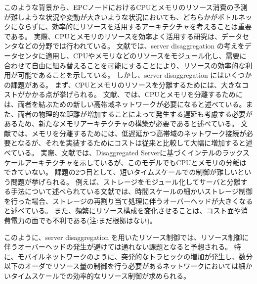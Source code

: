 \documentclass[a4j]{ujarticle}
\begin{document}
このような背景から、EPCノードにおけるCPUとメモリのリソース消費の予測が難しような状況や変動が大きいような状況においても、どちらかがボトルネックにならずに、効率的にリソースを活用するアーキテクチャを考えることは重要である。
実際、CPUとメモリのリソースを効率よく活用する研究は、データセンタなどの分野では行われている。
文献\cite{TechnoEconomicFrameworkforCloudInfrastructureACostStudyofResourceDisaggregation}では、server disaggregation の考えをデータセンタに適用し、CPUやメモリなどのリソースをモジュール化し、需要に合わせて自由に組み替えることを可能にすることにより、リソースの効率的な利用が可能であることを示している。
しかし、server disaggregation にはいくつかの課題がある。
まず、CPUとメモリのリソースを分離するためには、大きなコストがかかる点が挙げられる。
文献\cite{IntelsDisaggregatedServerRack}、\cite{EnhancedBackoffTimerSolutionforGTPCOverloadControl}では、CPUとメモリを分離するためには、両者を結ぶための新しい高帯域ネットワークが必要になると述べている。また、両者の物理的な距離が増加することによって発生する遅延も考慮する必要があるため、新たなメモリアーキテクチャの構築が必要であると述べている。
文献\cite{DisaggregatedandOpticallyInterconnectedMemoryWhenwillitbecosteffective}では、メモリを分離するためには、低遅延かつ高帯域のネットワーク接続が必要となるが、それを実装するためにコストは従来と比較して大幅に増加すると述べている。
実際、文献\cite{DisaggregatedServersDriveDataCenterEfficiencyandInnovation}では、Disaggregated Serverに基づくインテルのラックスケールアーキテクチャを示しているが、このモデルでもCPUとメモリの分離はできていない。
課題の2つ目として、短いタイムスケールでの制御が難しいという問題が挙げられる。
例えば、ストレージをモジュール化してサーバと分離する手法について述べられている文献\cite{UnderstandingRackScaleDisaggregatedStorage}では、時間スケールの細かいストレージ制御を行った場合、ストレージの再割り当て処理に伴うオーバーヘッドが大きくなると述べている。
また、頻繁にリソース構成を変化させることは、コスト面や消費電力の面でも不利である(注:まだ根拠はない)。

このように、server disaggregation を用いたリソース制御では、リソース制御に伴うオーバーヘッドの発生が避けては通れない課題となると予想される。
特に、モバイルネットワークのように、突発的なトラヒックの増加が発生し、数分以下のオーダでリソース量の制御を行う必要があるネットワークにおいては細かいタイムスケールでの効率的なリソース制御が求められる。
\end{document}
